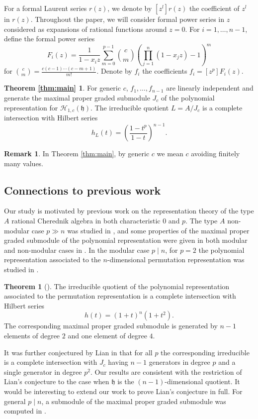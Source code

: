 \documentclass{amsart}
\numberwithin{equation}{section}
\theoremstyle{definition}
\newtheorem{theorem}{Theorem}[section]
\newtheorem*{remark}{Remark}
\newcommand{\h}{\mathfrak{h}}
\newcommand{\HH}{\mathcal{H}}
\begin{document}
For a formal Laurent series $r(z)$, we denote by $[z^l] r(z)$ the coefficient of $z^l$ in $r(z)$.  Throughout the paper, we will consider formal power series in $z$ considered as expansions of rational functions around $z = 0$. For $i = 1, \ldots, n - 1$, define the formal power series
\[
F_i(z)=\frac{1}{1-x_iz} \sum_{m=0}^{p-1} \binom{c}{m}\left(\prod_{j=1}^{n} (1-x_jz) - 1\right)^m
\]
for $\binom{c}{m} = \frac{c (c - 1) \cdots (c - m + 1)}{m!}$.  Denote by $f_i$ the coefficients $f_i = [z^p] F_i(z)$.

\newtheorem*{thm:main}{Theorem \ref{thm:main}} \begin{thm:main}
For generic $c$, $f_1, \ldots, f_{n-1}$ are linearly independent and generate the maximal proper graded submodule $J_c$ of the polynomial representation for $\HH_{1, c}(\h)$.  The irreducible quotient $L = A/J_c$ is a complete intersection with Hilbert series 
\[
h_L(t) = \left(\frac{1-t^p}{1-t}\right)^{n-1}.
\]
\end{thm:main}
\begin{remark}
In Theorem \ref{thm:main}, by generic $c$ we mean $c$ avoiding finitely many values.
\end{remark}

\subsection{Connections to previous work}

Our study is motivated by previous work on the representation theory of the type $A$ rational Cherednik algebra in both characteristic $0$ and $p$.  The type $A$ non-modular case $p \gg n$ was studied in \cite{BFG}, and some properties of the maximal proper graded submodule of the polynomial representation were given in both modular and non-modular cases in \cite{BC1}.  In the modular case $p \mid n$, for $p = 2$ the polynomial representation associated to the $n$-dimensional permutation representation was studied in \cite{L}.
\begin{theorem}[{\cite[Theorem 5.1]{L}}] \label{thm:lian}
The irreducible quotient of the polynomial representation associated to the permutation representation is a complete intersection with Hilbert series
\[
h(t) = (1 + t)^n (1 + t^2).
\]
The corresponding maximal proper graded submodule is generated by $n - 1$ elements of degree $2$ and one element of degree $4$. 
\end{theorem} 
It was further conjectured by Lian in \cite[Conjecture 5.2]{L} that for all $p$ the corresponding irreducible is a complete intersection with $J_c$ having $n - 1$ generators in degree $p$ and a single generator in degree $p^2$.  Our results are consistent with the restriction of Lian's conjecture to the case when $\h$ is the $(n - 1)$-dimensional quotient.  It would be interesting to extend our work to prove Lian's conjecture in full.  For general $p \mid n$, a submodule of the maximal proper graded submodule was computed in \cite[Proposition 6.1]{DS}.
\end{document}
